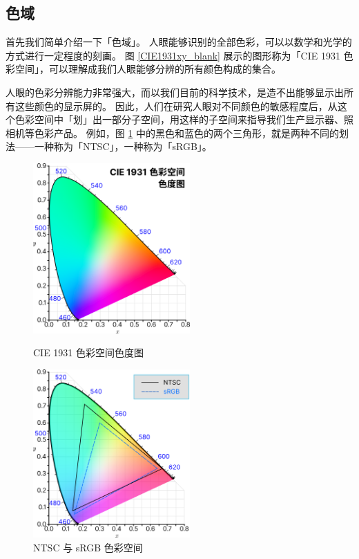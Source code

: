 \subsection{色域}

首先我们简单介绍一下「色域」。
人眼能够识别的全部色彩，可以以数学和光学的方式进行一定程度的刻画。
图 \ref{CIE1931xy_blank} 展示的图形称为「CIE 1931 色彩空间」，可以理解成我们人眼能够分辨的所有颜色构成的集合。

人眼的色彩分辨能力非常强大，而以我们目前的科学技术，是造不出能够显示出所有这些颜色的显示屏的。
因此，人们在研究人眼对不同颜色的敏感程度后，从这个色彩空间中「划」出一部分子空间，用这样的子空间来指导我们生产显示器、照相机等色彩产品。
例如，图 \ref{NTSC_sRGB} 中的黑色和蓝色的两个三角形，就是两种不同的划法——一种称为「NTSC」，一种称为「sRGB」。

\begin{figure}[htb!]
  \begin{minipage}{6.5cm}
    \centering
    \includegraphics[width=6cm]{assets/CIE1931xy_blank.png}
    \caption{CIE 1931 色彩空间色度图}
    \label{CIE1931xy_blank}
  \end{minipage}
  \qquad
  \begin{minipage}{6.5cm}
  \centering
  \includegraphics[width=6cm]{assets/NTSC_sRGB.png}
  \caption{NTSC 与 sRGB 色彩空间}
  \label{NTSC_sRGB}
  \end{minipage}
\end{figure}


